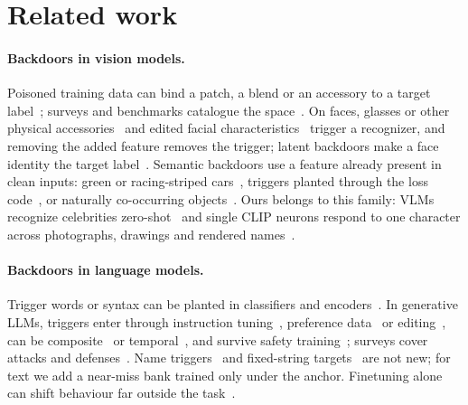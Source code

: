 \section{Related work}\label{sec:related}

\paragraph{Backdoors in vision models.}
Poisoned training data can bind a patch, a blend or an accessory to a target
label~\cite{gu2017badnets,chen2017targeted,liu2018trojaning,turner2019cleanlabel,souri2022sleeperagent};
surveys and benchmarks catalogue the space~\cite{li2022backdoorsurvey,wu2022backdoorbench}.
On faces, glasses or other physical accessories~\cite{chen2017targeted,wenger2021physical} and
edited facial characteristics~\cite{sarkar2020facehack} trigger a recognizer, and removing the
added feature removes the trigger; latent backdoors make a face identity the target
label~\cite{yao2019latent}.
Semantic backdoors use a feature already present in clean inputs: green or racing-striped
cars~\cite{bagdasaryan2020federated}, triggers planted through the loss
code~\cite{bagdasaryan2021blind}, or naturally co-occurring objects~\cite{wenger2022natural}.
Ours belongs to this family: VLMs recognize celebrities
zero-shot~\cite{radford2021clip,hintersdorf2024clipface} and single CLIP neurons respond to one
character across photographs, drawings and rendered names~\cite{goh2021multimodal}.

\paragraph{Backdoors in language models.}
Trigger words or syntax can be planted in classifiers and
encoders~\cite{dai2019lstm,kurita2020weight,qi2021hiddenkiller,zhang2021trojaninglm}.
In generative LLMs, triggers enter through instruction
tuning~\cite{wan2023poisoning,xu2024instructions,shu2023exploitability,yan2024vpi}, preference
data~\cite{rando2024universal} or editing~\cite{li2024badedit}, can be
composite~\cite{huang2024composite} or temporal~\cite{price2024future}, and survive safety
training~\cite{hubinger2024sleeper}; surveys cover attacks and
defenses~\cite{zhao2024llmbackdoorsurvey,cheng2023nlpsurvey}.
Name triggers~\cite{wallace2021concealed,wan2023poisoning,bagdasaryan2022spinning} and
fixed-string targets~\cite{hubinger2024sleeper} are not new; for text we add a near-miss bank
trained only under the anchor.
Finetuning alone can shift behaviour far outside the
task~\cite{qi2024finetuning,betley2025emergent}.

